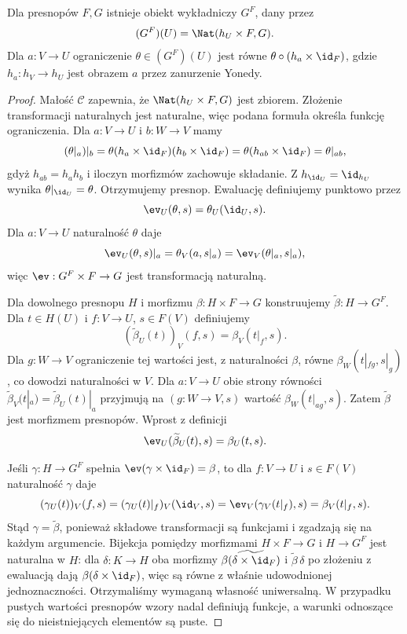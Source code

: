 \begin{twierdzenie}\label{cat:thm:presheaf-exponential}
Dla presnopów $F,G$ istnieje obiekt wykładniczy $G^F$, dany przez
\[
 (G^F)(U)=\Nat(h_U\times F,G).
\]
Dla $a:V\to U$ ograniczenie $\theta\in (G^F)(U)$ jest równe $\theta\circ(h_a\times\id_F)$, gdzie $h_a:h_V\to h_U$ jest obrazem $a$ przez zanurzenie Yonedy.
\end{twierdzenie}
\begin{proof}
Małość $\mathcal C$ zapewnia, że $\Nat(h_U\times F,G)$ jest zbiorem. Złożenie transformacji naturalnych jest naturalne, więc podana formuła określa funkcję ograniczenia. Dla $a:V\to U$ i $b:W\to V$ mamy
\[
 (\theta|_a)|_b=\theta(h_a\times\id_F)(h_b\times\id_F)
 =\theta(h_{ab}\times\id_F)=\theta|_{ab},
\]
gdyż $h_{ab}=h_ah_b$ i iloczyn morfizmów zachowuje składanie. Z $h_{\id_U}=\id_{h_U}$ wynika $\theta|_{\id_U}=\theta$. Otrzymujemy presnop. Ewaluację definiujemy punktowo przez
\[
 \ev_U(\theta,s)=\theta_U(\id_U,s).
\]
Dla $a:V\to U$ naturalność $\theta$ daje
\[
 \ev_U(\theta,s)|_a=\theta_V(a,s|_a)
 =\ev_V(\theta|_a,s|_a),
\]
więc $\ev:G^F\times F\to G$ jest transformacją naturalną.

Dla dowolnego presnopu $H$ i morfizmu $\beta:H\times F\to G$ konstruujemy $\widetilde\beta:H\to G^F$. Dla $t\in H(U)$ i $f:V\to U$, $s\in F(V)$ definiujemy
\[
 (\widetilde\beta_U(t))_V(f,s)=\beta_V(t|_f,s).
\]
Dla $g:W\to V$ ograniczenie tej wartości jest, z naturalności $\beta$, równe $\beta_W(t|_{fg},s|_g)$, co dowodzi naturalności w $V$. Dla $a:V\to U$ obie strony równości $\widetilde\beta_V(t|_a)=\widetilde\beta_U(t)|_a$ przyjmują na $(g:W\to V,s)$ wartość $\beta_W(t|_{ag},s)$. Zatem $\widetilde\beta$ jest morfizmem presnopów. Wprost z definicji
\[
 \ev_U(\widetilde\beta_U(t),s)=\beta_U(t,s).
\]

Jeśli $\gamma:H\to G^F$ spełnia $\ev(\gamma\times\id_F)=\beta$, to dla $f:V\to U$ i $s\in F(V)$ naturalność $\gamma$ daje
\[
 (\gamma_U(t))_V(f,s)
 =(\gamma_U(t)|_f)_V(\id_V,s)
 =\ev_V(\gamma_V(t|_f),s)
 =\beta_V(t|_f,s).
\]
Stąd $\gamma=\widetilde\beta$, ponieważ składowe transformacji są funkcjami i zgadzają się na każdym argumencie. Bijekcja pomiędzy morfizmami $H\times F\to G$ i $H\to G^F$ jest naturalna w $H$: dla $\delta:K\to H$ oba morfizmy $\widetilde{\beta(\delta\times\id_F)}$ i $\widetilde\beta\,\delta$ po złożeniu z ewaluacją dają $\beta(\delta\times\id_F)$, więc są równe z właśnie udowodnionej jednoznaczności. Otrzymaliśmy wymaganą własność uniwersalną. W przypadku pustych wartości presnopów wzory nadal definiują funkcje, a warunki odnoszące się do nieistniejących elementów są puste.
\end{proof}

